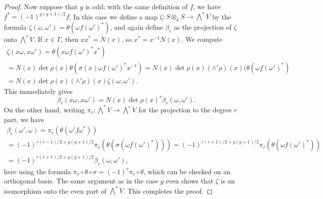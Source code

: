 \documentclass{article} %
\numberwithin{equation}{section}
\begin{document}
\begin{proof}
    Now suppose that $g$ is odd; with the same definition of $f$, we have $f^\ast = (-1)^{g(g+1)/2} f$. In this case we define a map $\zeta : S \otimes_k S \to \bigwedge^\ast V$ by the formula $\zeta(\omega, \omega') = \theta( \omega f (\omega')^\ast)$, and again define $\beta_r$ as the projection of $\zeta$ onto $\bigwedge^rV$. If $x \in \Gamma$, then $x x^\ast = N(x)$, so $x^\ast = x^{-1} N(x)$. We compute
    \begin{multline*} \zeta(x \omega, x \omega') = \theta(x \omega f (\omega')^\ast x^\ast) \\ = N(x) \det \rho(x) \theta(\sigma(x) \omega f (\omega')^\ast x^{-1}) = N(x) \det \rho(x) (\wedge' \rho)(x)(\theta (\omega f (\omega')^\ast) \\ = N(x) \det \rho(x) (\wedge' \rho)(x) \zeta(\omega, \omega'). 
    \end{multline*}
    This immediately gives
    \[ \beta_r(x \omega, x \omega') = N(x) \det \rho(x)^r \beta_r(\omega, \omega'). \]
    On the other hand, writing $\pi_r : \bigwedge^\ast V \to \bigwedge^r V$ for the projection to the degree $r$ part, we have 
    \begin{multline*} \beta_r(\omega', \omega) = \pi_r(\theta(\omega' f \omega^\ast)) \\ = (-1)^{r(r-1)/2+g(g+1)/2} \pi_r (\theta(\sigma( \omega f (\omega')^\ast))) = (-1)^{r(r+1)/2 + g(g+1)/2} \pi_r (\theta (\omega f (\omega')^\ast)) \\ = (-1)^{r(r+1)/2+g(g+1)/2} \beta_r(\omega, \omega'), 
    \end{multline*}
    here using the formula $\pi_r \circ \theta \circ \sigma = (-1)^r \pi_r \circ \theta$, which can be checked on an orthogonal basis. The same argument as in the case $g$ even shows that $\zeta$ is an isomorphism onto the even part of $\bigwedge^\ast V$. This completes the proof. 
\end{proof}
\end{document}
